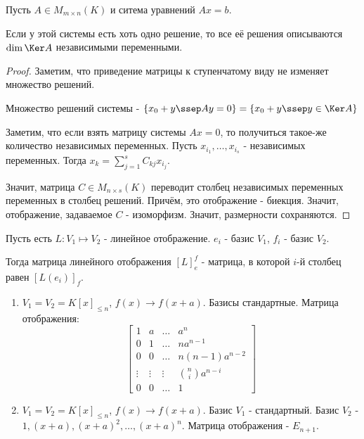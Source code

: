 \begin{statement} \thmslashn

    Пусть $A\in M_{m \times n}(K)$ и ситема уравнений $Ax = b$.

    Если у этой системы есть хоть одно решение, то все её решения описываются $\dim\Ker A$ независимыми переменными.
    \begin{proof} \thmslashn
    
        Заметим, что приведение матрицы к ступенчатому виду не изменяет множество решений.

        Множество решений системы - $\{x_0 + y \ssep Ay = 0\} = \{x_0 + y \ssep y\in \Ker A\} $

        Заметим, что если взять матрицу системы $Ax = 0$, то получиться такое-же количество независимых переменных. Пусть $x_{i_1}, \ldots, x_{i_{s}}$ - независимых переменных. Тогда $x_k = \sum\limits_{j=1}^{s} C_{kj}x_{i_{j}}$.

        Значит, матрица $C\in M_{n \times s}(K)$ переводит столбец независимых переменных переменных в столбец решений. Причём, это отображение - биекция. Значит, отображение, задаваемое $C$ - изоморфизм. Значит, размерности сохраняются.
    \end{proof}
\end{statement}
\begin{definition} \thmslashn 

    Пусть есть $L : V_1 \mapsto V_2$ - линейное отображение. $e_{i}$ - базис $V_1$, $f_{i}$ - базис $V_2$.

    Тогда матрица линейного отображения $[L]_{e}^{f}$ - матрица, в которой $i$-й столбец равен $[L(e_{i})]_{f}$.
\end{definition}
\begin{example} \thmslashn

    \begin{enumerate}
        \item $V_1 = V_2 = K[x]_{\le n}$, $f(x) \to f(x+a)$. Базисы стандартные. Матрица отображения:
            \begin{equation*}
                \begin{bmatrix} 
                    1 & a & \ldots & a^{n}\\
                    0 & 1 & \ldots & na^{n-1} \\
                    0 & 0 & \ldots & n(n-1)a^{n-2}\\
                    \vdots & \vdots & \vdots & \binom{n}{i}a^{n-i}\\
                    0 & 0 & \ldots & 1
                \end{bmatrix} 
            \end{equation*}
        \item $V_1 = V_2 = K[x]_{\le n}$, $f(x) \to f(x+a)$. Базис $V_1$ - стандартный. Базис $V_2$ - $1, (x+a), (x+a)^2, \ldots, (x+a)^{n}$. Матрица отображения - $E_{n+1}$.
    \end{enumerate}
\end{example}
